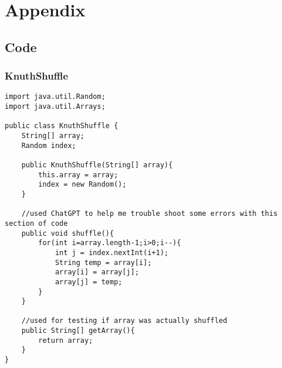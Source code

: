 \documentclass[10pt]{article}
\begin{document}

 



\section{Appendix}

\subsection{Code}

\subsubsection{KnuthShuffle}
\lstset{numbers=left, numberstyle=\tiny, stepnumber=1, numbersep=5pt, basicstyle=\footnotesize\ttfamily}
\begin{lstlisting}[frame=single, ]  
import java.util.Random;
import java.util.Arrays;

public class KnuthShuffle {
    String[] array;
    Random index;

    public KnuthShuffle(String[] array){
        this.array = array;
        index = new Random();
    }

    //used ChatGPT to help me trouble shoot some errors with this section of code
    public void shuffle(){
        for(int i=array.length-1;i>0;i--){
            int j = index.nextInt(i+1);
            String temp = array[i];
            array[i] = array[j];
            array[j] = temp;
        }
    }

    //used for testing if array was actually shuffled
    public String[] getArray(){
        return array;
    }
}
\end{lstlisting}
\end{document}
